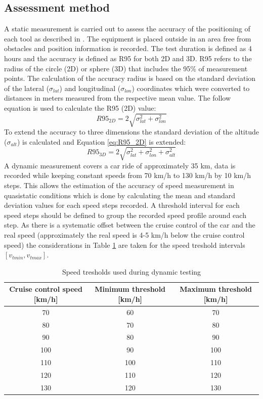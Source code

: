 \documentclass{article}
\begin{document}
		\subsection{Assessment method}
			A static measurement is carried out to assess the accuracy of the positioning of each tool as described in \cite{szotComparativeAnalysisPositioning2019}. The equipment is placed outside in an area free from obstacles and position information is recorded. The test duration is defined as 4 hours and the accuracy is defined as R95 for both 2D and 3D.  R95 refers to the radius of the circle (2D) or sphere (3D) that includes the 95\% of measurement points. The calculation of the accuracy radius is based on the standard deviation of the lateral ($\sigma_{lat}$) and longitudinal ($\sigma_{lon}$) coordinates which were converted to distances in meters measured from the respective mean value. The follow equation is used to calculate the R95 (2D) value:
			\begin{equation} \label{eq:R95_2D}
				R95_{2D}=2\sqrt{\sigma_{lat}^2+\sigma_{lon}^2}
			\end{equation}
			To extend the accuracy to three dimensions the standard deviation of the altitude ($\sigma_{alt}$) is calculated and Equation \ref{eq:R95_2D} is extended:
			\begin{equation} \label{eq:R95_3D}
				R95_{3D}=2\sqrt{\sigma_{lat}^2+\sigma_{lon}^2+\sigma_{alt}^2}
			\end{equation}
			A dynamic measurement covers a car ride of approximately 35 km, data is recorded while keeping constant speeds from 70 km/h to 130 km/h by 10 km/h steps. This allows the estimation of the accuracy of speed measurement in quasistatic conditions which is done by calculating the mean and standard deviation values for each speed steps recorded. A threshold interval for each speed steps should be defined to group the recorded speed profile around each step. As there is a systematic offset between the cruise control of the car and the real speed (approximately the real speed is 4-5 km/h below the cruise control speed) the considerations in Table \ref{table:speed_tresholds} are taken for the speed treshold intervals $[v_{tmin}, v_{tmax}]$.\\
			\begin{table}[h]
				\centering			
				\begin{tabular}{|c|c|c|}
					\hline 
					Cruise control speed [km/h] & Minimum threshold [km/h] & Maximum threshold [km/h] \\ 
					\hline 
					70 & 60 & 70 \\ 
					\hline 
					80 & 70 & 80 \\ 
					\hline 
					90 & 80 & 90 \\ 
					\hline 
					100 & 90 & 100 \\ 
					\hline 
					110 & 100 & 110 \\ 
					\hline 
					120 & 110 & 120 \\ 
					\hline 
					130 & 120 & 130 \\ 
					\hline 
				\end{tabular} 	
				\caption{Speed tresholds used during dynamic testing}
				\label{table:speed_tresholds}
			\end{table}
\end{document}
